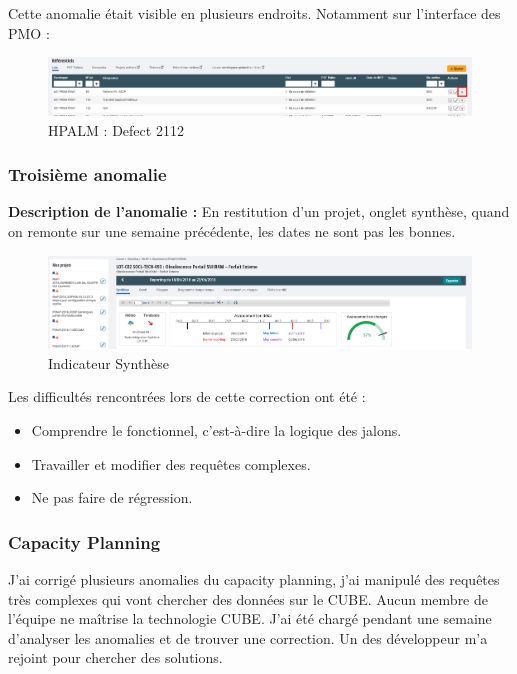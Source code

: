 Cette anomalie était visible en plusieurs endroits. Notamment sur l'interface des PMO :

\begin{figure}[!h]
\centering
\includegraphics[width=1\textwidth]{images/ano2.png}
\caption{HPALM : Defect 2112}
\end{figure}


\subsubsection{Troisième anomalie }

\textbf{Description de l'anomalie :} En restitution d'un projet, onglet synthèse, quand on remonte sur une semaine précédente, les dates ne sont pas les bonnes. 

\begin{figure}[!h]
\centering
\includegraphics[width=1\textwidth]{images/ppil-indicateur-synthese.PNG}
\caption{Indicateur Synthèse}
\end{figure}

Les difficultés rencontrées lors de cette correction ont été :
\begin{itemize}
    \item Comprendre le fonctionnel, c'est-à-dire la logique des jalons.
    \item Travailler et modifier des requêtes complexes.
    \item Ne pas faire de régression.
\end{itemize}


\subsubsection{Capacity Planning}

J'ai corrigé plusieurs anomalies du capacity planning, j'ai manipulé des requêtes très complexes qui vont chercher des données sur le CUBE. Aucun membre de l'équipe ne maîtrise la technologie CUBE. J'ai été chargé pendant une semaine d'analyser les anomalies et de trouver une correction. Un des développeur m'a rejoint pour chercher des solutions.


